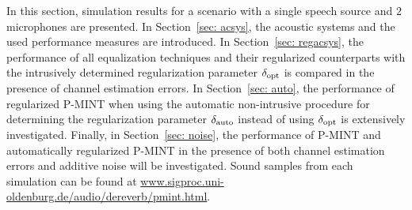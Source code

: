 \documentclass[10pt]{IEEEtran}
\begin{document}
In this section, simulation results for a scenario with a single speech source and $2$ microphones are presented.
In Section~\ref{sec: acsys}, the acoustic systems and the used performance measures are introduced.
In Section~\ref{sec: regacsys}, the performance of all equalization techniques and their regularized counterparts with the intrusively determined regularization parameter $\delta_{\rm opt}$ is compared in the presence of channel estimation errors.
In Section~\ref{sec: auto}, the performance of regularized P-MINT when using the automatic non-intrusive procedure for determining the regularization parameter $\delta_{\rm auto}$ instead of using $\delta_{\rm opt}$ is extensively investigated.
Finally, in Section~\ref{sec: noise}, the performance of P-MINT and automatically regularized P-MINT in the presence of both channel estimation errors and additive noise will be investigated.
Sound samples from each simulation can be found at {\small \url{www.sigproc.uni-oldenburg.de/audio/dereverb/pmint.html}}.
\end{document}
